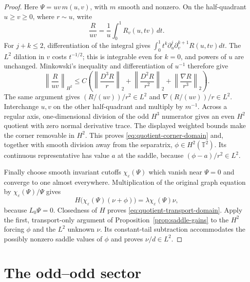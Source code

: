 \documentclass[reqno,11pt]{amsart}
\numberwithin{equation}{section}
\theoremstyle{remark}
\begin{document}
\begin{proof}
Here $\Psi=uv\,m(u,v)$, with $m$ smooth and nonzero.
On the half-quadrant $u\geq v\geq0$, where $r\sim u$,
write
\[
 \frac{R}{uv}=\frac1u\int_0^1 R_v(u,tv)\,dt.
\]
For $j+k\leq2$, differentiation of the integral gives
$\int_0^1t^k\partial_u^j\partial_v^{k+1}R(u,tv)dt$.
The $L^2$ dilation in $v$ costs $t^{-1/2}$; this is integrable
even for $k=0$, and powers of $u$ are unchanged.  Minkowski's
inequality and differentiation of $u^{-1}$ therefore give
\[
 \left\|\frac{R}{uv}\right\|_{H^2}
 \leq C\left(
 \left\|\frac{D^3R}{r}\right\|_2+
 \left\|\frac{D^2R}{r^2}\right\|_2+
 \left\|\frac{\nabla R}{r^3}\right\|_2\right).
\]
The same argument gives $(R/(uv))/r^2\in L^2$ and
$\nabla(R/(uv))/r\in L^2$.  Interchange $u,v$ on the other
half-quadrant and multiply by $m^{-1}$.  Across a regular axis,
one-dimensional division of the odd $H^3$ numerator gives an
even $H^2$ quotient with zero normal derivative trace.  The
displayed weighted bounds make the corner removable in $H^2$.
This proves \eqref{eq:quotient-corner-domain} and, together with
smooth division away from the separatrix, $\phi\in H^2(\mathbb T^2)$.
Its continuous representative has value $a$ at the saddle,
because $(\phi-a)/r^2\in L^2$.

Finally choose smooth invariant cutoffs $\chi_\varepsilon(\Psi)$
which vanish near $\Psi=0$ and converge to one almost everywhere.
Multiplication of the original graph equation by
$\chi_\varepsilon(\Psi)/\Psi$ gives
\[
 H\big(\chi_\varepsilon(\Psi)(\nu+\phi)\big)
       =\lambda\chi_\varepsilon(\Psi)\nu,
\]
because $L_0\Psi=0$.  Closedness of $H$ proves
\eqref{eq:quotient-transport-domain}.  Apply the first,
transport-only argument of Proposition~\ref{prop:saddle-gains}
to the $H^2$ forcing $\phi$ and the $L^2$ unknown $\nu$.
Its constant-tail subtraction accommodates the possibly nonzero
saddle values of $\phi$ and proves $\nu/d\in L^2$.
\end{proof}

\section{The odd--odd sector}
\label{sec:dd-exclusion}
\end{document}
